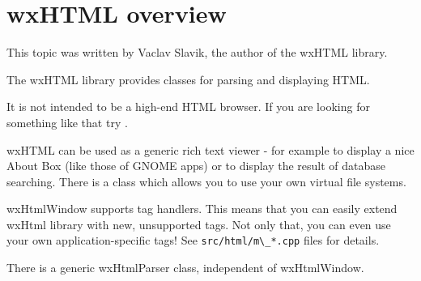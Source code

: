 \section{wxHTML overview}\label{wxhtml}

This topic was written by Vaclav Slavik, the author of the wxHTML library.

The wxHTML library provides classes for parsing and displaying HTML.

It is not intended to be a high-end HTML browser. If you are looking for
something like that try .

wxHTML can be used as a generic rich text viewer - for example to display 
a nice About Box (like those of GNOME apps) or to display the result of
database searching. There is a  
class which allows you to use your own virtual file systems.

wxHtmlWindow supports tag handlers. This means that you can easily
extend wxHtml library with new, unsupported tags. Not only that,
you can even use your own application-specific tags!
See \verb$src/html/m\_*.cpp$ files for details.

There is a generic wxHtmlParser class,
independent of wxHtmlWindow.









